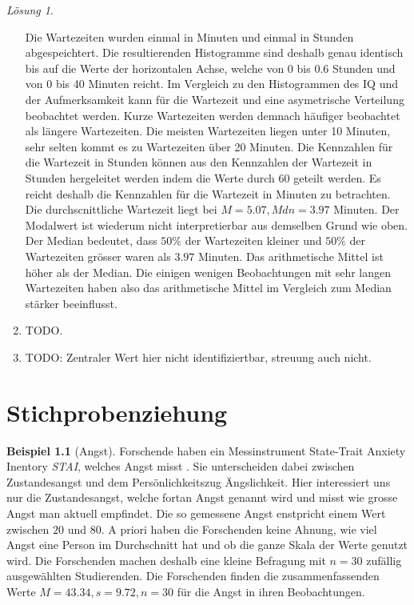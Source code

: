 \documentclass[
]{book}
\theoremstyle{definition}
\theoremstyle{definition}
\newtheorem{example}{Beispiel}[chapter]
\theoremstyle{definition}
\theoremstyle{definition}
\theoremstyle{remark}
\newtheorem*{solution}{Lösung}
\begin{document}
\begin{solution}
\begin{enumerate}
  Die Wartezeiten wurden einmal in Minuten und einmal in Stunden abgespeichtert. Die resultierenden Histogramme sind deshalb genau identisch bis auf die Werte der horizontalen Achse, welche von 0 bis 0.6 Stunden und von 0 bis 40 Minuten reicht. Im Vergleich zu den Histogrammen des IQ und der Aufmerksamkeit kann für die Wartezeit und eine asymetrische Verteilung beobachtet werden. Kurze Wartezeiten werden demnach häufiger beobachtet als längere Wartezeiten. Die meisten Wartezeiten liegen unter 10 Minuten, sehr selten kommt es zu Wartezeiten über 20 Minuten. Die Kennzahlen für die Wartezeit in Stunden können aus den Kennzahlen der Wartezeit in Stunden hergeleitet werden indem die Werte durch \(60\) geteilt werden. Es reicht deshalb die Kennzahlen für die Wartezeit in Minuten zu betrachten. Die durchscnittliche Wartezeit liegt bei \(M=5.07, Mdn = 3.97\) Minuten. Der Modalwert ist wiederum nicht interpretierbar aus demselben Grund wie oben. Der Median bedeutet, dass \(50\%\) der Wartezeiten kleiner und \(50\%\) der Wartezeiten grösser waren als \(3.97\) Minuten. Das arithmetische Mittel ist höher als der Median. Die einigen wenigen Beobachtungen mit sehr langen Wartezeiten haben also das arithmetische Mittel im Vergleich zum Median stärker beeinflusst.
\item
  TODO.
\item
  TODO: Zentraler Wert hier nicht identifiziertbar, streuung auch nicht.
\end{enumerate}

\end{solution}

\chapter{Stichprobenziehung}\label{stichprobenziehung}

\begin{example}[Angst]
\protect\hypertarget{exm:angst}{}\label{exm:angst}Forschende haben ein Messinstrument State-Trait Anxiety Inentory \emph{STAI}, welches Angst misst \citep{spielberger1983manual}. Sie unterscheiden dabei zwischen Zustandesangst und dem Persönlichkeitszug Ängslichkeit. Hier interessiert uns nur die Zustandesangst, welche fortan Angst genannt wird und misst wie grosse Angst man aktuell empfindet. Die so gemessene Angst enstpricht einem Wert zwischen \(20\) und \(80\). A priori haben die Forschenden keine Ahnung, wie viel Angst eine Person im Durchschnitt hat und ob die ganze Skala der Werte genutzt wird. Die Forschenden machen deshalb eine kleine Befragung mit \(n =30\) zufällig ausgewählten Studierenden. Die Forschenden finden die zusammenfassenden Werte \(M=43.34, s = 9.72, n = 30\) für die Angst in ihren Beobachtungen.
\end{example}
\end{document}
